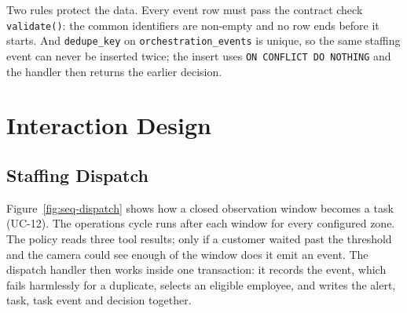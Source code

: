 Two rules protect the data. Every event row must pass the contract check \texttt{validate()}: the common identifiers are non-empty and no row ends before it starts. And \texttt{dedupe\_key} on \texttt{orchestration\_events} is unique, so the same staffing event can never be inserted twice; the insert uses \texttt{ON CONFLICT DO NOTHING} and the handler then returns the earlier decision.

\section{Interaction Design}
\subsection{Staffing Dispatch}
Figure~\ref{fig:seq-dispatch} shows how a closed observation window becomes a task (UC-12). The operations cycle runs after each window for every configured zone. The policy reads three tool results; only if a customer waited past the threshold and the camera could see enough of the window does it emit an event. The dispatch handler then works inside one transaction: it records the event, which fails harmlessly for a duplicate, selects an eligible employee, and writes the alert, task, task event and decision together.

